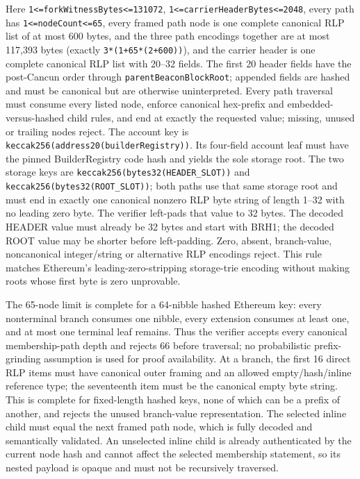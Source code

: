 \documentclass[a4paper,11pt]{article}
\newcommand{\code}[1]{\nolinkurl{#1}}
\begin{document}
Here \code{1<=forkWitnessBytes<=131072},
\code{1<=carrierHeaderBytes<=2048}, every path has
\code{1<=nodeCount<=65}, every framed path node is one complete canonical RLP
list of at most 600 bytes, and the three path encodings together are at most
117,393 bytes (exactly \code{3*(1+65*(2+600))}),
and the carrier header is one complete canonical RLP list with 20--32 fields.
The first 20 header fields have the post-Cancun order through
\code{parentBeaconBlockRoot}; appended fields are hashed and must be canonical
but are otherwise uninterpreted.  Every path traversal must consume every
listed node, enforce canonical hex-prefix and embedded-versus-hashed child
rules, and end at exactly the requested value; missing, unused or trailing
nodes reject.  The account key is
\code{keccak256(address20(builderRegistry))}.  Its four-field account leaf must
have the pinned BuilderRegistry code hash and yields the sole storage root.
The two storage keys are \code{keccak256(bytes32(HEADER_SLOT))} and
\code{keccak256(bytes32(ROOT_SLOT))}; both paths use that same storage root and
must end in exactly one canonical nonzero RLP byte string of length 1--32 with
no leading zero byte.  The verifier left-pads that value to 32 bytes.  The
decoded HEADER value must already be 32 bytes and start with BRH1; the decoded
ROOT value may be shorter before left-padding.  Zero, absent, branch-value,
noncanonical integer/string or alternative RLP encodings reject.  This rule
matches Ethereum's leading-zero-stripping storage-trie encoding without making
roots whose first byte is zero unprovable.

The 65-node limit is complete for a 64-nibble hashed Ethereum key: every
nonterminal branch consumes one nibble, every extension consumes at least one,
and at most one terminal leaf remains.  Thus the verifier accepts every
canonical membership-path depth and rejects 66 before traversal; no
probabilistic prefix-grinding assumption is used for proof availability.
At a branch, the first 16 direct RLP items must have canonical outer framing
and an allowed empty/hash/inline reference type; the seventeenth item must be
the canonical empty byte string.  This is complete for fixed-length hashed
keys, none of which can be a prefix of another, and rejects the unused
branch-value representation.  The selected inline child must equal the next
framed path node, which is fully decoded and semantically validated.  An
unselected inline child is already authenticated by the current node hash and
cannot affect the selected membership statement, so its nested payload is
opaque and must not be recursively traversed.
\end{document}
